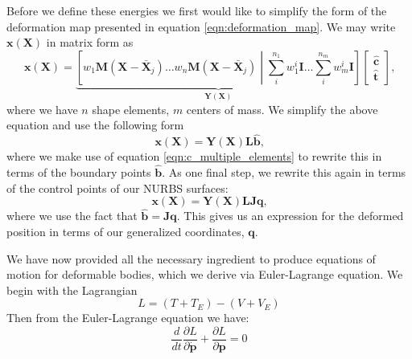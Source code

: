 Before we define these energies we first would like to simplify the form of the deformation map presented in equation \ref{eqn:deformation_map}. We may write $\mathbf{x}(\mathbf{X})$ in matrix form as
\begin{equation}
\mathbf{x}(\mathbf{X}) = \underbrace{\left[w_1\mathbf{M}(\mathbf{X - \bar{X}}_j) \dots w_n\mathbf{M}(\mathbf{X - \bar{X}}_j) \middle| \sum_i^{n_1}w_1^i\mathbf{I} \dots \sum_i^{n_m}w_m^i\mathbf{I} \right]}_{\mathbf{Y}(\mathbf{X})}
\begin{bmatrix}
\mathbf{\hat{c}} \\
\mathbf{\hat{t}}
\end{bmatrix}
\text{,}
\end{equation}
where we have $n$ shape elements, $m$ centers of mass. We simplify the above equation and use the following form
\begin{equation}
\label{eqn:x_simple_form}
\mathbf{x}(\mathbf{X}) = \mathbf{Y}(\mathbf{X})\mathbf{L}\hat{\mathbf{b}}
\text{,}
\end{equation}
where we make use of equation \ref{eqn:c_multiple_elements} to rewrite this in terms of the boundary points $\mathbf{\hat{b}}$. As one final step, we rewrite this again in terms of the control points of our NURBS surfaces:
\begin{equation}
\label{eqn:compact_x_map}
\mathbf{x}(\mathbf{X}) = \mathbf{Y}(\mathbf{X})\mathbf{LJq}
\text{,}
\end{equation}
where we use the fact that $\mathbf{\hat{b}} = \mathbf{Jq}$.  This gives us an expression for the deformed position in terms of our generalized coordinates, $\mathbf{q}$.


We have now provided all the necessary ingredient to produce equations of motion for deformable bodies, which we derive via Euler-Lagrange equation. We begin with the Lagrangian
\begin{equation}
    L=(T+T_E)-(V + V_E)
\end{equation}
Then from the Euler-Lagrange equation we have:
\begin{equation}
    \frac{d}{dt} \frac{\partial L}{\partial \dot{\mathbf{p}}} + \frac{\partial L}{\partial {\mathbf{p}}} = 0
\end{equation}



